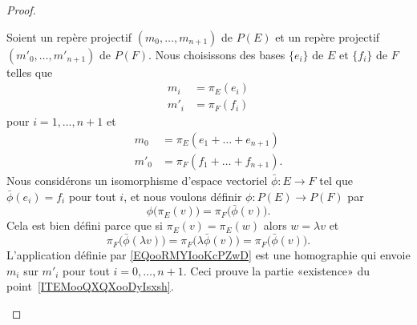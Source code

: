 \begin{proof}
\begin{subproof}
		Soient un repère projectif \( (m_0,\ldots, m_{n+1})\) de \( P(E)\) et un repère projectif \( (m'_0,\ldots, m'_{n+1})\) de \( P(F)\). Nous choisissons des bases \( \{ e_i \}\) de \( E\) et \(  \{ f_i \}\) de \( F\) telles que
		\begin{subequations}
			\begin{align}
				m_i  & =\pi_E(e_i) \\
				m'_i & =\pi_F(f_i)
			\end{align}
		\end{subequations}
		pour \( i=1,\ldots, n+1\) et
		\begin{subequations}
			\begin{align}
				m_0  & =\pi_E(e_1+\ldots +e_{n+1})  \\
				m'_0 & =\pi_F(f_1+\ldots +f_{n+1}).
			\end{align}
		\end{subequations}
		Nous considérons un isomorphisme d'espace vectoriel \( \bar\phi\colon E\to F\) tel que \( \bar\phi(e_i)=f_i\) pour tout \( i\), et nous voulons définir \( \phi\colon P(E)\to P(F)\) par
		\begin{equation}        \label{EQooRMYIooKcPZwD}
			\phi\big( \pi_E(v) \big)=\pi_F\big( \bar\phi(v) \big).
		\end{equation}
		Cela est bien défini parce que si \( \pi_E(v)=\pi_E(w)\) alors \( w=\lambda v\) et
		\begin{equation}
			\pi_F\big( \bar\phi(\lambda v) \big)=\pi_F\big( \lambda\bar\phi(v) \big)=\pi_F\big( \bar\phi(v) \big).
		\end{equation}
		L'application définie par \eqref{EQooRMYIooKcPZwD} est une homographie qui envoie \( m_i\) sur \( m'_i\) pour tout \( i=0,\ldots, n+1\). Ceci prouve la partie «existence» du point~\ref{ITEMooQXQXooDyIsxsh}.


\end{subproof}
\end{proof}
